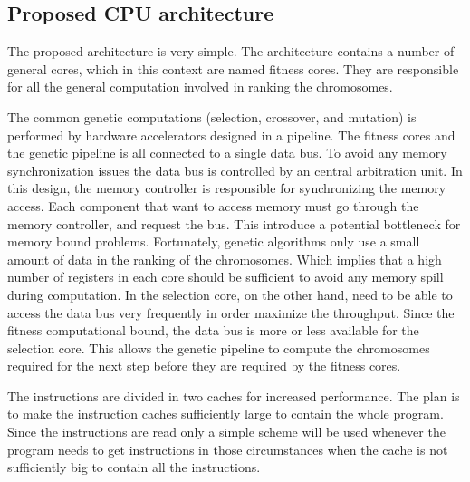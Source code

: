 \subsection {Proposed CPU architecture}

The proposed architecture is very simple.
The architecture contains a number of general cores, which in this context are named fitness cores.
They are responsible for all the general computation involved in ranking the chromosomes.

The common genetic computations (selection, crossover, and mutation) is performed by hardware accelerators designed in a pipeline.
The fitness cores and the genetic pipeline is all connected to a single data bus.
To avoid any memory synchronization issues the data bus is controlled by an central arbitration unit.
In this design, the memory controller is responsible for synchronizing the memory access.
Each component that want to access memory must go through the memory controller, and request the bus.
This introduce a potential bottleneck for memory bound problems.
Fortunately, genetic algorithms only use a small amount of data in the ranking of the chromosomes.
Which implies that a high number of registers in each core should be sufficient to avoid any memory spill during computation.
In the selection core, on the other hand, need to be able to access the data bus very frequently in order maximize the throughput.
Since the fitness computational bound, the data bus is more or less available for the selection core.
This allows the genetic pipeline to compute the chromosomes required for the next step before they are required by the fitness cores. 


The instructions are divided in two caches for increased performance.
The plan is to make the instruction caches sufficiently large to contain the whole program.
Since the instructions are read only a simple scheme will be used whenever the program needs to get instructions in those circumstances when the cache is not sufficiently big to contain all the instructions. 



